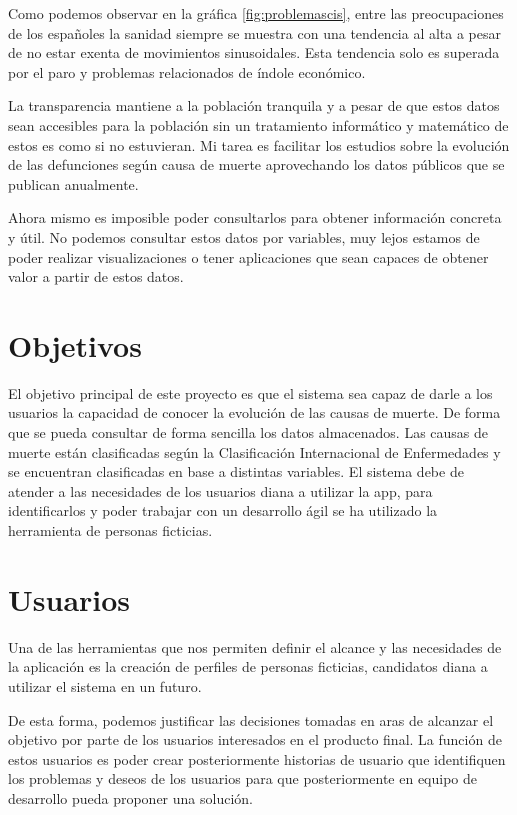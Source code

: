 Como podemos observar en la gráfica \ref{fig:problemascis}, entre las preocupaciones de los españoles la sanidad siempre se muestra con una tendencia al alta a pesar de no estar exenta de movimientos sinusoidales. Esta tendencia solo es superada por el paro y problemas relacionados de índole económico.

La transparencia mantiene a la población tranquila y a pesar de que estos datos sean accesibles para la población sin un tratamiento informático y matemático de estos es como si no estuvieran. Mi tarea es facilitar los estudios sobre la evolución de las defunciones según causa de muerte aprovechando los datos públicos que se publican anualmente.

Ahora mismo es imposible poder consultarlos para obtener información concreta y útil. No podemos consultar estos datos por variables, muy lejos estamos de poder realizar visualizaciones o tener aplicaciones que sean capaces de obtener valor a partir de estos datos.

\section{Objetivos}
\label{sec:obj}
El objetivo principal de este proyecto es que el sistema sea capaz de darle a los usuarios la capacidad de conocer la evolución de las causas de muerte. De forma que se pueda consultar de forma sencilla los datos almacenados. Las causas de muerte están clasificadas según la Clasificación Internacional de Enfermedades y se encuentran clasificadas en base a distintas variables. El sistema debe de atender a las necesidades de los usuarios diana a utilizar la app, para identificarlos y poder trabajar con un desarrollo ágil se ha utilizado la herramienta de personas ficticias.

\section{Usuarios}
\label{sec:usu}
Una de las herramientas que nos permiten definir el alcance y las necesidades de la aplicación es la creación de perfiles de personas ficticias, candidatos diana a utilizar el sistema en un futuro.

De esta forma, podemos justificar las decisiones tomadas en aras de alcanzar el objetivo por parte de los usuarios interesados en el producto final. La función de estos usuarios es poder crear posteriormente historias de usuario que identifiquen los problemas y deseos de los usuarios para que posteriormente en equipo de desarrollo pueda proponer una solución.

